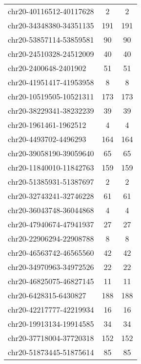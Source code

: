 \begin{longtable}{lSS}
	chr20-40116512-40117628 & 2      & 2                          \\
	chr20-34348380-34351135 & 191    & 191                        \\
	chr20-53857114-53859581 & 90     & 90                         \\
	chr20-24510328-24512009 & 40     & 40                         \\
	chr20-2400648-2401902   & 51     & 51                         \\
	chr20-41951417-41953958 & 8      & 8                          \\
	chr20-10519505-10521311 & 173    & 173                        \\
	chr20-38229341-38232239 & 39     & 39                         \\
	chr20-1961461-1962512   & 4      & 4                          \\
	chr20-4493702-4496293   & 164    & 164                        \\
	chr20-39058190-39059640 & 65     & 65                         \\
	chr20-11840010-11842763 & 159    & 159                        \\
	chr20-51385931-51387697 & 2      & 2                          \\
	chr20-32743241-32746228 & 61     & 61                         \\
	chr20-36043748-36044868 & 4      & 4                          \\
	chr20-47940674-47941937 & 27     & 27                         \\
	chr20-22906294-22908788 & 8      & 8                          \\
	chr20-46563742-46565560 & 42     & 42                         \\
	chr20-34970963-34972526 & 22     & 22                         \\
	chr20-46825075-46827145 & 11     & 11                         \\
	chr20-6428315-6430827   & 188    & 188                        \\
	chr20-42217777-42219934 & 16     & 16                         \\
	chr20-19913134-19914585 & 34     & 34                         \\
	chr20-37718004-37720318 & 152    & 152                        \\
	chr20-51873445-51875614 & 85     & 85                         \\

\end{longtable}
